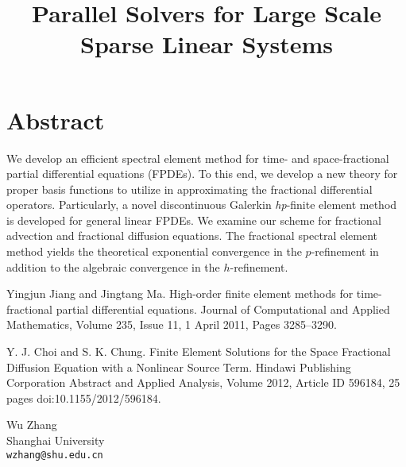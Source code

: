 \documentclass[article,A4,11pt]{llncs}%
\begin{document}
\section*{Abstract}
We develop an efficient spectral element method for time- and space-fractional partial differential equations (FPDEs). To this end, we develop a new theory for proper basis functions to utilize in approximating the fractional differential operators. Particularly, a novel discontinuous Galerkin \textit{hp}-finite element method is developed for general linear FPDEs. We examine our scheme for fractional advection and fractional diffusion equations. The fractional spectral element method yields the theoretical exponential convergence in the $p$-refinement in addition to the algebraic convergence in the $h$-refinement. 


\begin{thebibliography}{10}
{\sc Yingjun Jiang and Jingtang Ma}. {High-order finite element methods for time-fractional partial differential equations}. Journal of Computational and Applied Mathematics, Volume 235, Issue 11, 1 April 2011, Pages 3285–3290.

{\sc Y. J. Choi and S. K. Chung}. {Finite Element Solutions for the Space Fractional Diffusion Equation with a Nonlinear Source Term}. Hindawi Publishing Corporation Abstract and Applied Analysis, Volume 2012, Article ID 596184, 25 pages doi:10.1155/2012/596184.
\end{thebibliography}

\title{Parallel Solvers for Large Scale Sparse Linear Systems}
 \author{} \institute{}
\maketitle
\begin{center}
{\large Wu Zhang}\\
Shanghai University\\
{\tt wzhang@shu.edu.cn}
\end{center}
\end{document}

